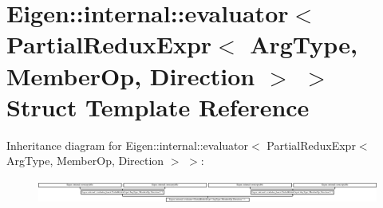 \hypertarget{struct_eigen_1_1internal_1_1evaluator_3_01_partial_redux_expr_3_01_arg_type_00_01_member_op_00_01_direction_01_4_01_4}{}\section{Eigen\+:\+:internal\+:\+:evaluator$<$ Partial\+Redux\+Expr$<$ Arg\+Type, Member\+Op, Direction $>$ $>$ Struct Template Reference}
\label{struct_eigen_1_1internal_1_1evaluator_3_01_partial_redux_expr_3_01_arg_type_00_01_member_op_00_01_direction_01_4_01_4}
Inheritance diagram for Eigen\+:\+:internal\+:\+:evaluator$<$ Partial\+Redux\+Expr$<$ Arg\+Type, Member\+Op, Direction $>$ $>$\+:\begin{figure}[H]
\begin{center}
\leavevmode
\includegraphics[height=0.809249cm]{struct_eigen_1_1internal_1_1evaluator_3_01_partial_redux_expr_3_01_arg_type_00_01_member_op_00_01_direction_01_4_01_4}
\end{center}
\end{figure}
